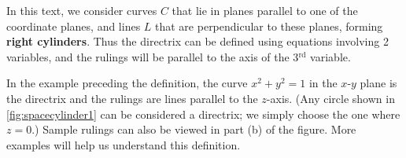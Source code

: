 

In this text, we consider curves $C$ that lie in planes parallel to one of the coordinate planes, and lines $L$ that are perpendicular to these planes, forming \textbf{right cylinders}. Thus the directrix can be defined using equations involving 2 variables, and the rulings will be parallel to the axis of the 3$^\text{rd}$ variable.

In the example preceding the definition, the curve $x^2+y^2=1$ in the $x$-$y$ plane is the directrix and the rulings are lines parallel to the $z$-axis. (Any circle shown in \autoref{fig:spacecylinder1} can be considered a directrix; we simply choose the one where $z=0$.) Sample rulings can also be viewed in part (b) of the figure. More examples will help us understand this definition.

